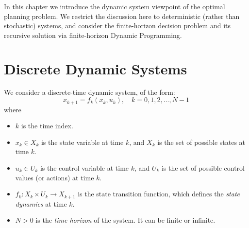 %
%
%
%
%
%
%
%

In this chapter we introduce the dynamic system viewpoint of the optimal planning problem. We restrict the discussion here to deterministic (rather than stochastic) systems, and consider the finite-horizon decision problem and its recursive solution via finite-horizon Dynamic Programming.

\section{Discrete Dynamic Systems}
We consider a discrete-time dynamic system, of the form:
\[{x_{k + 1}} = {f_k}({x_k},{u_k}),\quad k = 0,1,2, \ldots ,N - 1\]
where
\begin{itemize}
  \item $k$ is the time index.
  \item ${x_k} \in {X_k}$ is the state variable at time $k$, and $X_k$ is the set of possible states at time $k$.
  \item ${u_k} \in {U_k}$  is the control variable at time $k$, and $U_k$ is the set of possible control values (or actions) at time $k$.
  \item ${f_k}:{X_k} \times {U_k} \to {X_{k + 1}}$ is the state transition function, which defines the \emph{state dynamics} at time $k$.
  \item $N>0$ is the \emph{time horizon} of the system.  It can be finite or infinite.
\end{itemize}
 	

